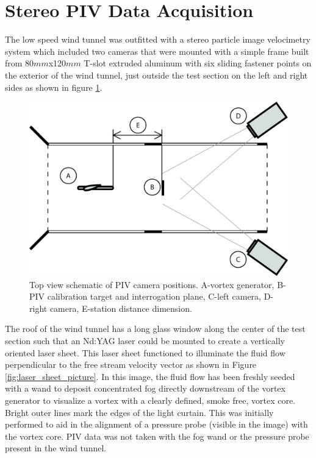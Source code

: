 

\section{Stereo PIV Data Acquisition}

The low speed wind tunnel was outfitted with a stereo particle image 
velocimetry system which included two cameras that were mounted with a simple 
frame built from 80$mm$x120$mm$ T-slot extruded aluminum with six sliding 
fastener points on the exterior of the wind tunnel, just outside the test 
section on the left and right sides as shown in figure \ref{fig:pivsetup}. 

\begin{figure}[H]
	\centering
	\includegraphics[width=5in]{figs/piv_method/piv_camera_diagram}
	\caption{Top view schematic of PIV camera positions. A-vortex generator, 
	B-PIV 
		calibration target and interrogation plane, C-left camera, D-right 
		camera, E-station distance dimension.}
	\label{fig:pivsetup}
\end{figure}

The roof of the wind tunnel has a long glass window along the center of the 
test section such that an Nd:YAG laser could be mounted to create a vertically 
oriented laser sheet. This laser sheet functioned to illuminate the fluid flow 
perpendicular to the free stream velocity vector as 
shown in Figure \ref{fig:laser_sheet_picture}. In this image, the fluid flow 
has been freshly seeded with a wand to deposit concentrated fog directly 
downstream of the vortex generator to visualize a vortex with a clearly 
defined, smoke free, vortex core. Bright outer lines mark the edges of the 
light curtain. This was initially performed to aid in the alignment of a 
pressure probe (visible in the image) with the vortex core. PIV data was not 
taken with the fog wand or the pressure probe present in the wind tunnel.


